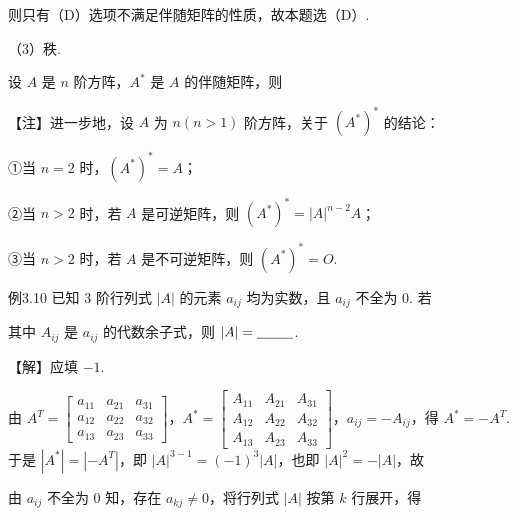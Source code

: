则只有（D）选项不满足伴随矩阵的性质，故本题选（D）.

（3）秩.


设 $A$ 是 $n$ 阶方阵，$A^*$ 是 $A$ 的伴随矩阵，则


\begin{fnote}
【注】进一步地，设 $A$ 为 $n(n>1)$ 阶方阵，关于 $(A^*)^*$ 的结论：

①当 $n=2$ 时，$(A^*)^*=A$；

②当 $n>2$ 时，若 $A$ 是可逆矩阵，则 $(A^*)^*=|A|^{n-2}A$；

③当 $n>2$ 时，若 $A$ 是不可逆矩阵，则 $(A^*)^*=O$.
\end{fnote}

\begin{fcard}{例3.10}
已知 3 阶行列式 $|A|$ 的元素 $a_{ij}$ 均为实数，且 $a_{ij}$ 不全为 0. 若


其中 $A_{ij}$ 是 $a_{ij}$ 的代数余子式，则 $|A|=\underline{\hspace{2.6em}}$.
\end{fcard}

【解】应填 $-1$.

由 $A^{T}=\begin{bmatrix}a_{11}&a_{21}&a_{31}\\a_{12}&a_{22}&a_{32}\\a_{13}&a_{23}&a_{33}\end{bmatrix}$，$A^*=\begin{bmatrix}A_{11}&A_{21}&A_{31}\\A_{12}&A_{22}&A_{32}\\A_{13}&A_{23}&A_{33}\end{bmatrix}$，$a_{ij}=-A_{ij}$，得 $A^*=-A^{T}$. 于是 $|A^*|=|-A^{T}|$，即 $|A|^{3-1}=(-1)^{3}|A|$，也即 $|A|^{2}=-|A|$，故


由 $a_{ij}$ 不全为 0 知，存在 $a_{kj}\ne0$，将行列式 $|A|$ 按第 $k$ 行展开，得

